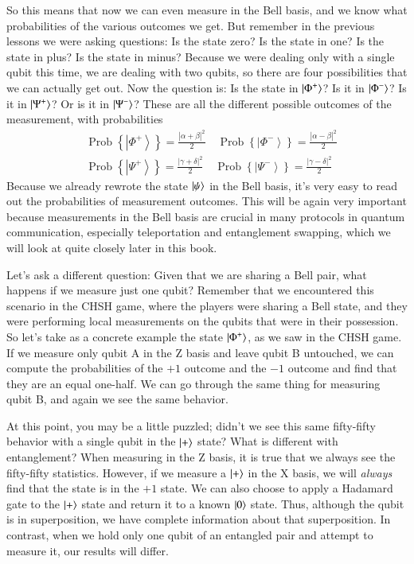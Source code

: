 So this means that now we can even measure in the Bell basis, and we know what probabilities of the various outcomes we get. But remember in the previous lessons we were asking questions: Is the state zero? Is the state in one? Is the state in plus? Is the state in minus? Because we were dealing only with a single qubit this time, we are dealing with two qubits, so there are four possibilities that we can actually get out. Now the question is: Is the state in $\left| \Phi^+ \right\rangle$? Is it in $\left| \Phi^- \right\rangle$? Is it in $\left| \Psi^+ \right\rangle$? Or is it in $\left| \Psi^- \right\rangle$? These are all the different possible outcomes of the measurement, with probabilities
\begin{equation}
\begin{aligned}
&\operatorname{Prob}\left\{\left|\Phi^{+}\right\rangle\right\}=\frac{|\alpha+\beta|^{2}}{2} \quad \operatorname{Prob}\left\{\left|\Phi^{-}\right\rangle\right\}=\frac{|\alpha-\beta|^{2}}{2} \\
&\operatorname{Prob}\left\{\left|\Psi^{+}\right\rangle\right\}=\frac{|\gamma+\delta|^{2}}{2} \quad \operatorname{Prob}\left\{\left|\Psi^{-}\right\rangle\right\}=\frac{|\gamma-\delta|^{2}}{2}
\end{aligned}
\end{equation}
Because we already rewrote the state $\left| \psi \right\rangle$ in the Bell basis, it's very easy to read out the probabilities of measurement outcomes.
This will be again very important because measurements in the Bell basis are crucial in many protocols in quantum communication, especially teleportation and entanglement swapping, which we will look at quite closely later in this book.

Let's ask a different question: Given that we are sharing a Bell pair, what happens if we measure just one qubit? Remember that we encountered this scenario in the CHSH game, where the players were sharing a Bell state, and they were performing local measurements on the qubits that were in their possession. So let's take as a concrete example the state $\left| \Phi^+ \right\rangle$, as we saw in the CHSH game. If we measure only qubit A in the Z basis and leave qubit B untouched, we can compute the probabilities of the $+1$ outcome and the $-1$ outcome and find that they are an equal one-half.   We can go through the same thing for measuring qubit B, and again we see the same behavior.

\label{page:plus-is-pure}
At this point, you may be a little puzzled; didn't we see this same fifty-fifty behavior with a single qubit in the $\left| + \right\rangle$ state?  What is different with entanglement?  When measuring in the Z basis, it is true that we always see the fifty-fifty statistics.  However, if we measure a $\left| + \right\rangle$ in the X basis, we will \emph{always} find that the state is in the $+1$ state.  We can also choose to apply a Hadamard gate to the $\left| + \right\rangle$ state and return it to a known $\left| 0 \right\rangle$ state.  Thus, although the qubit is in superposition, we have complete information about that superposition.  In contrast, when we hold only one qubit of an entangled pair and attempt to measure it, our results will differ.

